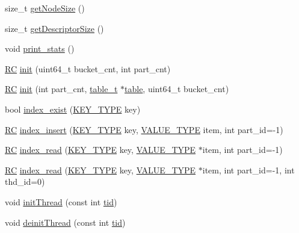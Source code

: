 \begin{DoxyCompactItemize}
\item 
size\+\_\+t \hyperlink{classIndex_ad70e606faaf0a67b690275b8f8ca5d5f}{get\+Node\+Size} ()
\item 
size\+\_\+t \hyperlink{classIndex_a0e0b37468dc2b549208da43466a68a94}{get\+Descriptor\+Size} ()
\item 
void \hyperlink{classIndex_ab300e132e8a12e3334003227a2e3f618}{print\+\_\+stats} ()
\item 
\hyperlink{global_8h_a78c49a674c810fdd03d20432f7be864a}{RC} \hyperlink{classIndex_a9f14dfc7c370a32604d91af76907f6c6}{init} (uint64\+\_\+t bucket\+\_\+cnt, int part\+\_\+cnt)
\item 
\hyperlink{global_8h_a78c49a674c810fdd03d20432f7be864a}{RC} \hyperlink{classIndex_a92819c544e6ac6af5a2d4aa03a61a351}{init} (int part\+\_\+cnt, \hyperlink{classtable__t}{table\+\_\+t} $\ast$\hyperlink{classindex__base_abb51a82fc0bf85a82aa83376d111641f}{table}, uint64\+\_\+t bucket\+\_\+cnt)
\item 
bool \hyperlink{classIndex_a43908d9915fe59437d20a82324bcda61}{index\+\_\+exist} (\hyperlink{index__base_8h_ae35c40bc2f912c11f0e36ac66cba4489}{K\+E\+Y\+\_\+\+T\+Y\+PE} key)
\item 
\hyperlink{global_8h_a78c49a674c810fdd03d20432f7be864a}{RC} \hyperlink{classIndex_a03544bdceed7feb756712086fb239de1}{index\+\_\+insert} (\hyperlink{index__base_8h_ae35c40bc2f912c11f0e36ac66cba4489}{K\+E\+Y\+\_\+\+T\+Y\+PE} key, \hyperlink{microbench_2main_8cpp_ae17cb099b4c9aee7835032339b5a9e0d}{V\+A\+L\+U\+E\+\_\+\+T\+Y\+PE} item, int part\+\_\+id=-\/1)
\item 
\hyperlink{global_8h_a78c49a674c810fdd03d20432f7be864a}{RC} \hyperlink{classIndex_ab930b74f611f4704fa1fb9a8bb9f57f8}{index\+\_\+read} (\hyperlink{index__base_8h_ae35c40bc2f912c11f0e36ac66cba4489}{K\+E\+Y\+\_\+\+T\+Y\+PE} key, \hyperlink{microbench_2main_8cpp_ae17cb099b4c9aee7835032339b5a9e0d}{V\+A\+L\+U\+E\+\_\+\+T\+Y\+PE} $\ast$item, int part\+\_\+id=-\/1)
\item 
\hyperlink{global_8h_a78c49a674c810fdd03d20432f7be864a}{RC} \hyperlink{classIndex_abb1666dd897887f22d8e4dc92966b207}{index\+\_\+read} (\hyperlink{index__base_8h_ae35c40bc2f912c11f0e36ac66cba4489}{K\+E\+Y\+\_\+\+T\+Y\+PE} key, \hyperlink{microbench_2main_8cpp_ae17cb099b4c9aee7835032339b5a9e0d}{V\+A\+L\+U\+E\+\_\+\+T\+Y\+PE} $\ast$item, int part\+\_\+id=-\/1, int thd\+\_\+id=0)
\item 
void \hyperlink{classIndex_a6a509df225912ffea8547fa0daa57d8c}{init\+Thread} (const int \hyperlink{microbench_2main_8cpp_a9ca9869868fe7e7a38a921cc7de4103f}{tid})
\item 
void \hyperlink{classIndex_a62ecc92aa23b7292ea6735ff9ac21c80}{deinit\+Thread} (const int \hyperlink{microbench_2main_8cpp_a9ca9869868fe7e7a38a921cc7de4103f}{tid})
\end{DoxyCompactItemize}
